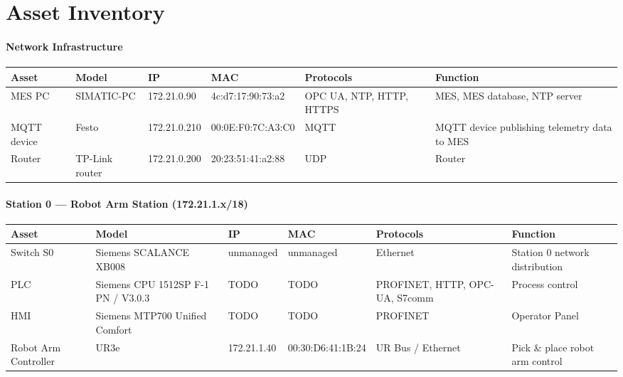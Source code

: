 \documentclass{report}
\begin{document}
\section{Asset Inventory}

{\scriptsize
\setlength{\tabcolsep}{3pt}

\paragraph{Network Infrastructure}
\begin{longtable}{L{2cm} L{2.1cm} L{2.1cm} L{2.6cm} L{2.4cm} L{4cm}}
\toprule
\textbf{Asset} & \textbf{Model} & \textbf{IP} & \textbf{MAC} & \textbf{Protocols} & \textbf{Function} \\
\midrule \endhead
    MES PC & SIMATIC-PC & 172.21.0.90 & 4c:d7:17:90:73:a2 & OPC
    UA, NTP, HTTP, HTTPS & MES, MES database, NTP server \\

    MQTT device & Festo & 172.21.0.210 & 00:0E:F0:7C:A3:C0 &
    MQTT & MQTT device publishing telemetry data to MES \\

    Router & TP-Link router & 172.21.0.200 &
    20:23:51:41:a2:88 & UDP & Router \\
\bottomrule
\end{longtable}

\paragraph{Station 0 --- Robot Arm Station (172.21.1.x/18)}
\begin{longtable}{L{2cm} L{2.1cm} L{2.1cm} L{2.6cm} L{2.4cm} L{4cm}}
\toprule
\textbf{Asset} & \textbf{Model} & \textbf{IP} & \textbf{MAC} & \textbf{Protocols} & \textbf{Function} \\
\midrule \endhead
    Switch S0 & Siemens SCALANCE XB008 & unmanaged & unmanaged &
    Ethernet & Station 0 network distribution \\

    PLC & Siemens CPU 1512SP F-1 PN / V3.0.3 & TODO & TODO & PROFINET, HTTP, OPC-UA, S7comm & Process control \\

    HMI & Siemens MTP700 Unified Comfort & TODO & TODO & PROFINET & Operator Panel\\

    Robot Arm Controller & UR3e & 172.21.1.40 & 00:30:D6:41:1B:24 & UR Bus / Ethernet & Pick \& place robot arm control \\ 


\end{longtable}}
\end{document}
